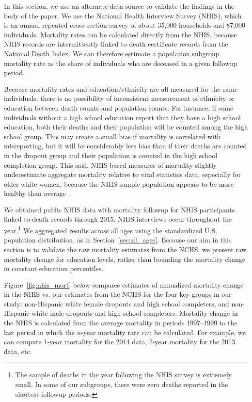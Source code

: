 In this section, we use an alternate data source to validate the
findings in the body of the paper. We use the National Health
Interview Survey (NHIS), which is an annual repeated cross-section
survey of about 35,000 households and 87,000 individuals. Mortality
rates can be calculated directly from the NHIS, because NHIS records
are intermittently linked to death certificate records from the
National Death Index. We can therefore estimate a population subgroup
mortality rate as the share of individuals who are deceased in a given
followup period.

Because mortality rates and education/ethnicity are all measured for
the same individuals, there is no possibility of inconsistent measurement of ethnicity or education between death counts and population counts. For instance,
if some individuals without a high school education report that they
have a high school education, both their deaths and their population
will be counted among the high school group. This may create a small
bias if mortality is correlated with misreporting, but it will be
considerably less bias than if their deaths are counted in the dropout
group and their population is counted in the high school completion
group.  This said, NHIS-based measures of mortality slightly
underestimate aggregate mortality relative to vital statistics data,
especially for older white women, because the NHIS sample population appears to be more healthy than average \citep{ingram2008}.

We obtained public NHIS data with mortality followup for
NHIS participants linked to death records
through 2015. NHIS interviews occur
throughout the year.\footnote{The sample of deaths in the year following the NHIS
  survey is extremely small. In some of our subgroups, there were zero
  deaths reported in the shortest followup periods.} We aggregated
results across all ages using the standardized U.S. population
distribution, as in Section~\ref{sec:all_ages}. Because our aim in
this section is to validate the raw mortality estimates from the NCHS,
we present raw mortality change for education levels, rather than
bounding the mortality change in constant education percentiles.

Figure~\ref{fig:nhis_mort} below compares estimates of annualized
mortality change in the NHIS vs. our estimates from the NCHS for the
four key groups in our study: non-Hispanic white female dropouts and
high school completers, and non-Hispanic white male dropouts and high
school completers. Mortality change in the NHIS is calculated from
the average mortality in periods 1997--1999 to the last period in which the $n$-year mortality rate can be
calculated. For example, we can compute 1-year mortality for the 2014
data, 2-year mortality for the 2013 data, etc. 

